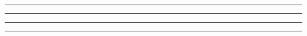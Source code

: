 \documentclass[10pt,landscape,a4paper]{article}
\begin{document}
\small
\begin{multicols*}{4}
	
\setcounter{section}{0}
 \hrule
 \hrule
 \hrule
 \hrule


\end{multicols*}
\end{document}
